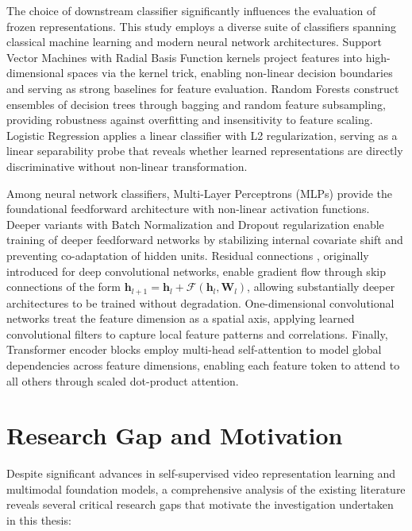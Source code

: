 The choice of downstream classifier significantly influences the evaluation of frozen representations. This study employs a diverse suite of classifiers spanning classical machine learning and modern neural network architectures. Support Vector Machines with Radial Basis Function kernels \citep{cortes1995svm} project features into high-dimensional spaces via the kernel trick, enabling non-linear decision boundaries and serving as strong baselines for feature evaluation. Random Forests \citep{breiman2001randomforests} construct ensembles of decision trees through bagging and random feature subsampling, providing robustness against overfitting and insensitivity to feature scaling. Logistic Regression \citep{cox1958logistic} applies a linear classifier with L2 regularization, serving as a linear separability probe that reveals whether learned representations are directly discriminative without non-linear transformation.

Among neural network classifiers, Multi-Layer Perceptrons (MLPs) \citep{rumelhart1986backprop} provide the foundational feedforward architecture with non-linear activation functions. Deeper variants with Batch Normalization \citep{ioffe2015batchnorm} and Dropout \citep{srivastava2014dropout} regularization enable training of deeper feedforward networks by stabilizing internal covariate shift and preventing co-adaptation of hidden units. Residual connections \citep{he2016resnet}, originally introduced for deep convolutional networks, enable gradient flow through skip connections of the form $\mathbf{h}_{l+1} = \mathbf{h}_l + \mathcal{F}(\mathbf{h}_l, \mathbf{W}_l)$, allowing substantially deeper architectures to be trained without degradation. One-dimensional convolutional networks \citep{lecun1998cnn} treat the feature dimension as a spatial axis, applying learned convolutional filters to capture local feature patterns and correlations. Finally, Transformer encoder blocks \citep{vaswani2017attention} employ multi-head self-attention to model global dependencies across feature dimensions, enabling each feature token to attend to all others through scaled dot-product attention.

\section{Research Gap and Motivation}

Despite significant advances in self-supervised video representation learning and multimodal foundation models, a comprehensive analysis of the existing literature reveals several critical research gaps that motivate the investigation undertaken in this thesis:

